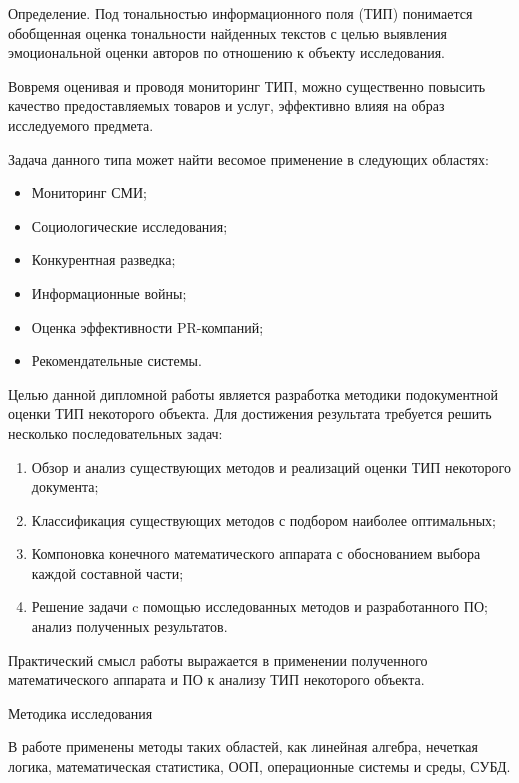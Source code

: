 \documentclass[a4paper,14pt,russian]{extreport}
\begin{document}
Определение. Под тональностью информационного поля \mbox{(ТИП)} понимается обобщенная оценка тональности найденных текстов с целью выявления эмоциональной оценки авторов по отношению к объекту исследования.

Вовремя оценивая и проводя мониторинг \mbox{ТИП}, можно существенно повысить качество предоставляемых товаров и услуг, эффективно влияя на образ исследуемого предмета.

Задача данного типа может найти весомое применение в следующих областях:

\begin{itemize}
\item Мониторинг СМИ;
\item Социологические исследования;
\item Конкурентная разведка;
\item Информационные войны;
\item Оценка эффективности PR-компаний;
\item Рекомендательные системы.
\end{itemize}

Целью данной дипломной работы является разработка методики подокументной оценки \mbox{ТИП} некоторого объекта. Для достижения результата требуется решить несколько последовательных задач:

\begin{enumerate}
\item Обзор и анализ существующих методов и реализаций оценки \mbox{ТИП} некоторого документа;
\item Классификация существующих методов с подбором наиболее оптимальных;
\item Компоновка конечного математического аппарата с обоснованием выбора каждой составной части;
\item Решение задачи c помощью исследованных методов и разработанного \mbox{ПО}; анализ полученных результатов.
\end{enumerate}

Практический смысл работы выражается в применении полученного математического аппарата и \mbox{ПО} к анализу ТИП некоторого объекта.

Методика исследования

В работе применены методы таких областей, как линейная алгебра, нечеткая логика, математическая статистика, \mbox{ООП}, операционные системы и среды, \mbox{СУБД}.
\end{document}
